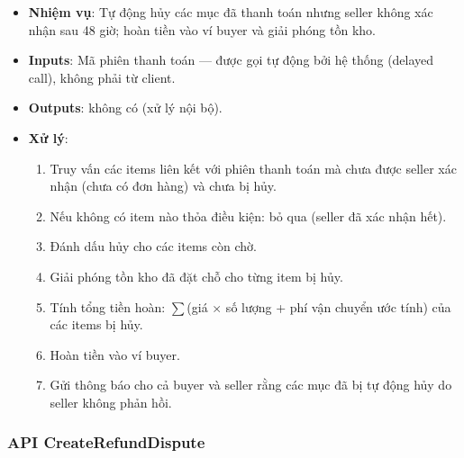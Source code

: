 \begin{itemize}[leftmargin=*]
  \item \textbf{Nhiệm vụ}: Tự động hủy các mục đã thanh toán nhưng seller không xác nhận sau 48 giờ; hoàn tiền vào ví buyer và giải phóng tồn kho.
  \item \textbf{Inputs}: Mã phiên thanh toán --- được gọi tự động bởi hệ thống (delayed call), không phải từ client.
  \item \textbf{Outputs}: không có (xử lý nội bộ).
  \item \textbf{Xử lý}:
    \begin{enumerate}
      \item Truy vấn các items liên kết với phiên thanh toán mà chưa được seller xác nhận (chưa có đơn hàng) và chưa bị hủy.
      \item Nếu không có item nào thỏa điều kiện: bỏ qua (seller đã xác nhận hết).
      \item Đánh dấu hủy cho các items còn chờ.
      \item Giải phóng tồn kho đã đặt chỗ cho từng item bị hủy.
      \item Tính tổng tiền hoàn: $\sum$(giá $\times$ số lượng + phí vận chuyển ước tính) của các items bị hủy.
      \item Hoàn tiền vào ví buyer.
      \item Gửi thông báo cho cả buyer và seller rằng các mục đã bị tự động hủy do seller không phản hồi.
    \end{enumerate}
\end{itemize}

\subsubsection{API CreateRefundDispute}
\label{subsubsec:api-create-refund-dispute}

